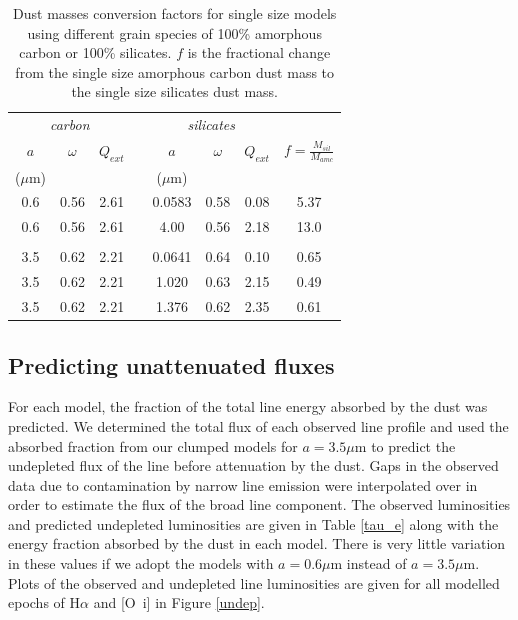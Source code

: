 \documentclass[useAMS,usenatbib,usegraphicx]{mnras}
\begin{document}
\begin{table}
	\caption{Dust masses conversion factors for single size models using different grain species of 100\% amorphous carbon or 100\% silicates. $f$ is the fractional change from the single size amorphous carbon dust mass to the single size silicates dust mass.}
	\label{tb_sil}
	\begin{center}
  	\begin{tabular}{@{} cccccccc @{}}
    	\hline
	\multicolumn{3}{c}{\textit{carbon}} && \multicolumn{3}{c}{\textit{silicates}} & \\
$a$ &$\omega$ &  $Q_{ext}$ & &$a$&$\omega$ & $Q_{ext}$ & $f=\frac{M_{sil}}{M_{amc}}$ \\
($\mu$m) &&&&($\mu$m)\\
\hline
0.6 & 0.56 & 2.61 & &0.0583 & 0.58 &0.08 & 5.37 \\
0.6 &0.56 & 2.61 & &4.00 & 0.56 & 2.18 & 13.0 \\
 \\
3.5 & 0.62 &2.21 & &0.0641 & 0.64 & 0.10 & 0.65 \\
3.5 & 0.62 &2.21 & &1.020 & 0.63 & 2.15 & 0.49 \\
3.5 & 0.62 & 2.21 & &1.376 & 0.62 & 2.35 & 0.61 \\


    \hline
  \end{tabular}
  \end{center}
\end{table}




\subsection{Predicting unattenuated fluxes}

For each model, the fraction of the total line energy absorbed by the dust was predicted.  We determined the total flux of each observed line profile and used the absorbed fraction from our clumped models for $a=3.5\mu$m to predict the undepleted flux of the line before attenuation by the dust.  Gaps in the observed data due to contamination by narrow line emission were interpolated over in order to estimate the flux of the broad line component.  The observed luminosities and predicted undepleted luminosities are given in Table \ref{tau_e} along with the energy fraction absorbed by the dust in each model.  There is very little variation in these values if we adopt the models with $a=0.6\mu$m instead of $a=3.5\mu$m.  Plots of the observed and undepleted line luminosities are given for all modelled epochs of H$\alpha$ and [O~{\sc i}] in Figure \ref{undep}.
\end{document}
